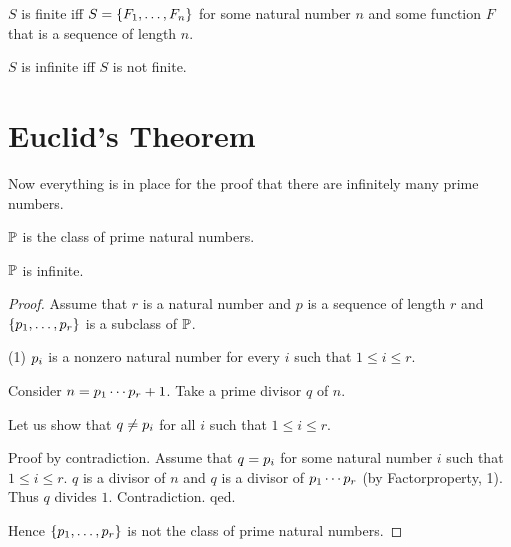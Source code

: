\documentclass[11pt]{article}
\begin{document}
\begin{forthel}

\begin{definition} $S$ is finite iff 
$S = \{F_{1},\dots,F_{n}\}$ for some natural number $n$ and some function $F$ that is 
a sequence of length $n$.
\end{definition}

\begin{definition} $S$ is infinite iff $S$ is not finite.
\end{definition}

\end{forthel}

\section{Euclid's Theorem}

Now everything is in place for the proof that there
are infinitely many prime numbers.
\begin{forthel}

\begin{signature} $\mathbb{P}$ is the class of prime natural numbers.
\end{signature}



\begin{theorem}[Euclid]
$\mathbb{P}$ is infinite.
\end{theorem}
\begin{proof}
Assume that $r$ is a natural number and 
$p$ is a sequence of length $r$ and
$\{p_{1},\dots,p_{r}\}$ is a subclass of $\mathbb{P}$.

(1) $p_{i}$ is a nonzero natural number for every $i$ such
that $1 \leq i \leq r$.

Consider $n=p_{1} \cdots p_{r}+1$.
Take a prime divisor $q$ of $n$.

Let us show that $q \neq p_{i}$ for all $i$ such that 
$1 \leq i \leq r$.

Proof by contradiction.
Assume that $q=p_{i}$ for some natural number $i$ such that
$1 \leq i \leq r$.
$q$ is a divisor of $n$ and $q$ is a divisor of $p_{1} \cdots p_{r}$
(by Factorproperty, 1).
Thus $q$ divides $1$. Contradiction. qed.

Hence $\{p_{1},\dots,p_{r}\}$ is not the class of prime natural numbers.
\end{proof}
\end{forthel}
\end{document}
